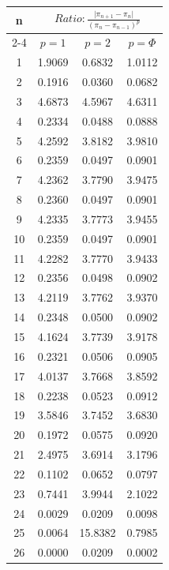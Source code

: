 \documentclass{article}
\providecommand{\abs}[1]{\lvert#1\rvert}
\begin{document}
\begin{tabular}{|c|c|c|c|}
\hline
\multirow{2}{*}{n} & \multicolumn{3}{|c|}{$Ratio:\displaystyle\frac{\abs{\pi_{n+1}-\pi_{n}}}{({\pi_{n}-\pi_{n-1}})^p}$} \\
\cline{2-4}
 & $p=1$ & $p=2$ & $p=\Phi$ \\
\hline
 1 & 1.9069 & 0.6832 & 1.0112 \\ 
  2 & 0.1916 & 0.0360 & 0.0682 \\ 
  3 & 4.6873 & 4.5967 & 4.6311 \\ 
  4 & 0.2334 & 0.0488 & 0.0888 \\ 
  5 & 4.2592 & 3.8182 & 3.9810 \\ 
  6 & 0.2359 & 0.0497 & 0.0901 \\ 
  7 & 4.2362 & 3.7790 & 3.9475 \\ 
  8 & 0.2360 & 0.0497 & 0.0901 \\ 
  9 & 4.2335 & 3.7773 & 3.9455 \\ 
 10 & 0.2359 & 0.0497 & 0.0901 \\ 
 11 & 4.2282 & 3.7770 & 3.9433 \\ 
 12 & 0.2356 & 0.0498 & 0.0902 \\ 
 13 & 4.2119 & 3.7762 & 3.9370 \\ 
 14 & 0.2348 & 0.0500 & 0.0902 \\ 
 15 & 4.1624 & 3.7739 & 3.9178 \\ 
 16 & 0.2321 & 0.0506 & 0.0905 \\ 
 17 & 4.0137 & 3.7668 & 3.8592 \\ 
 18 & 0.2238 & 0.0523 & 0.0912 \\ 
 19 & 3.5846 & 3.7452 & 3.6830 \\ 
 20 & 0.1972 & 0.0575 & 0.0920 \\ 
 21 & 2.4975 & 3.6914 & 3.1796 \\ 
 22 & 0.1102 & 0.0652 & 0.0797 \\ 
 23 & 0.7441 & 3.9944 & 2.1022 \\ 
 24 & 0.0029 & 0.0209 & 0.0098 \\ 
 25 & 0.0064 & 15.8382 & 0.7985 \\ 
 26 & 0.0000 & 0.0209 & 0.0002 \\ 
 \hline 
\end{tabular}
\end{document}
